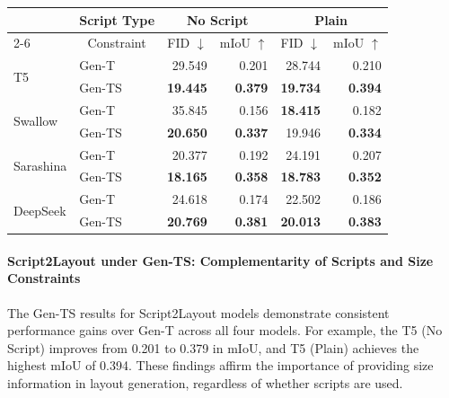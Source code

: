 \documentclass[sigconf, screen, review, anonymous]{acmart}
\begin{document}
\begin{table}[t]

\begin{tabular}{llrrrr}
\toprule
&\multicolumn{1}{r}{Script Type} & \multicolumn{2}{c}{No Script} & \multicolumn{2}{c}{Plain} \\
\cmidrule{2-6}
\multicolumn{1}{c}{Model} & \multicolumn{1}{c}{Constraint} & \multicolumn{1}{c}{FID $\downarrow$} & \multicolumn{1}{c}{mIoU $\uparrow$} & \multicolumn{1}{c}{FID $\downarrow$} & \multicolumn{1}{c}{mIoU $\uparrow$} \\
\midrule
\multirow{2}{*}{T5} & Gen-T   & 29.549          & 0.201          & 28.744          & 0.210 \\
                    & Gen-TS  & \textbf{19.445} & \textbf{0.379} & \textbf{19.734} & \textbf{0.394} \\ 
\midrule
\multirow{2}{*}{Swallow} & Gen-T   & 35.845          & 0.156          & \textbf{18.415} & 0.182 \\
                         & Gen-TS  & \textbf{20.650} & \textbf{0.337} & 19.946          & \textbf{0.334} \\ 
\midrule
\multirow{2}{*}{Sarashina} & Gen-T   & 20.377          & 0.192 & 24.191          & 0.207 \\
                           & Gen-TS  & \textbf{18.165} & \textbf{0.358}          & \textbf{18.783} & \textbf{0.352} \\ 
\midrule
\multirow{2}{*}{DeepSeek} & Gen-T   & 24.618          & 0.174          & 22.502 & 0.186 \\
                          & Gen-TS  & \textbf{20.769} & \textbf{0.381} & \textbf{20.013}          & \textbf{0.383} \\
\bottomrule
\end{tabular}
\label{tab:constraint_Script2Layoyut}
\end{table}

\paragraph{Script2Layout under Gen-TS: Complementarity of Scripts and Size Constraints}
The Gen-TS results for Script2Layout models demonstrate consistent performance gains over Gen-T across all four models. For example, the T5 (No Script) improves from 0.201 to 0.379 in mIoU, and T5 (Plain) achieves the highest mIoU of 0.394. These findings affirm the importance of providing size information in layout generation, regardless of whether scripts are used.
\end{document}
